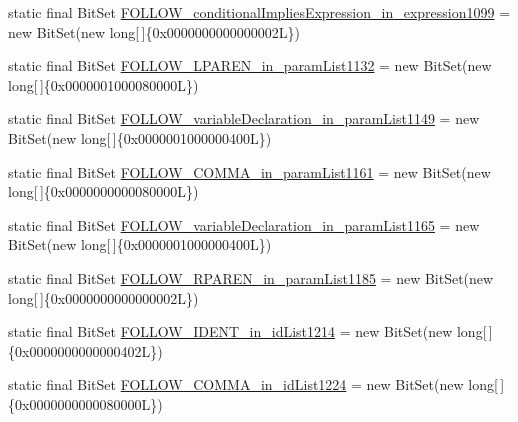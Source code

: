 \begin{DoxyCompactItemize}
\item 
static final Bit\-Set \hyperlink{classorg_1_1tzi_1_1use_1_1parser_1_1shell_1_1_shell_command_parser_acf0f24a89209f8a4570fa8ad0f89f761}{F\-O\-L\-L\-O\-W\-\_\-conditional\-Implies\-Expression\-\_\-in\-\_\-expression1099} = new Bit\-Set(new long\mbox{[}$\,$\mbox{]}\{0x0000000000000002\-L\})
\item 
static final Bit\-Set \hyperlink{classorg_1_1tzi_1_1use_1_1parser_1_1shell_1_1_shell_command_parser_a6e195c4a379199ad9ea9bba151af6569}{F\-O\-L\-L\-O\-W\-\_\-\-L\-P\-A\-R\-E\-N\-\_\-in\-\_\-param\-List1132} = new Bit\-Set(new long\mbox{[}$\,$\mbox{]}\{0x0000001000080000\-L\})
\item 
static final Bit\-Set \hyperlink{classorg_1_1tzi_1_1use_1_1parser_1_1shell_1_1_shell_command_parser_aa12eab21c31f7adb0d8d799c53fb2969}{F\-O\-L\-L\-O\-W\-\_\-variable\-Declaration\-\_\-in\-\_\-param\-List1149} = new Bit\-Set(new long\mbox{[}$\,$\mbox{]}\{0x0000001000000400\-L\})
\item 
static final Bit\-Set \hyperlink{classorg_1_1tzi_1_1use_1_1parser_1_1shell_1_1_shell_command_parser_a46c4e6f526c1cc3ba305678c29b2e087}{F\-O\-L\-L\-O\-W\-\_\-\-C\-O\-M\-M\-A\-\_\-in\-\_\-param\-List1161} = new Bit\-Set(new long\mbox{[}$\,$\mbox{]}\{0x0000000000080000\-L\})
\item 
static final Bit\-Set \hyperlink{classorg_1_1tzi_1_1use_1_1parser_1_1shell_1_1_shell_command_parser_ab2a4ff7ede699bfd224cadc99ab9a42b}{F\-O\-L\-L\-O\-W\-\_\-variable\-Declaration\-\_\-in\-\_\-param\-List1165} = new Bit\-Set(new long\mbox{[}$\,$\mbox{]}\{0x0000001000000400\-L\})
\item 
static final Bit\-Set \hyperlink{classorg_1_1tzi_1_1use_1_1parser_1_1shell_1_1_shell_command_parser_a2bde7a600a95965254658a96c4f82e28}{F\-O\-L\-L\-O\-W\-\_\-\-R\-P\-A\-R\-E\-N\-\_\-in\-\_\-param\-List1185} = new Bit\-Set(new long\mbox{[}$\,$\mbox{]}\{0x0000000000000002\-L\})
\item 
static final Bit\-Set \hyperlink{classorg_1_1tzi_1_1use_1_1parser_1_1shell_1_1_shell_command_parser_a4324818e6c7963b84440f70466c13f4a}{F\-O\-L\-L\-O\-W\-\_\-\-I\-D\-E\-N\-T\-\_\-in\-\_\-id\-List1214} = new Bit\-Set(new long\mbox{[}$\,$\mbox{]}\{0x0000000000000402\-L\})
\item 
static final Bit\-Set \hyperlink{classorg_1_1tzi_1_1use_1_1parser_1_1shell_1_1_shell_command_parser_a7f20743637e2cb79c005ab01be8ede16}{F\-O\-L\-L\-O\-W\-\_\-\-C\-O\-M\-M\-A\-\_\-in\-\_\-id\-List1224} = new Bit\-Set(new long\mbox{[}$\,$\mbox{]}\{0x0000000000080000\-L\})
\item 

\end{DoxyCompactItemize}
